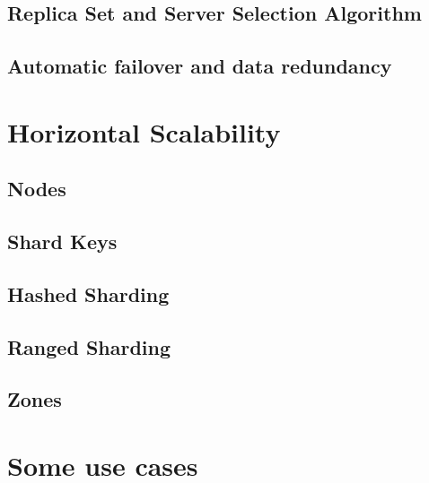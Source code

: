 \subsection{Replica Set and Server Selection Algorithm}

\subsection{Automatic failover and data redundancy}


\section{Horizontal Scalability}
\label{sec:7}

\subsection{Nodes}

\subsection{Shard Keys}

\subsection{Hashed Sharding}

\subsection{Ranged Sharding}

\subsection{Zones}


\section{Some use cases}
\label{sec:8}




